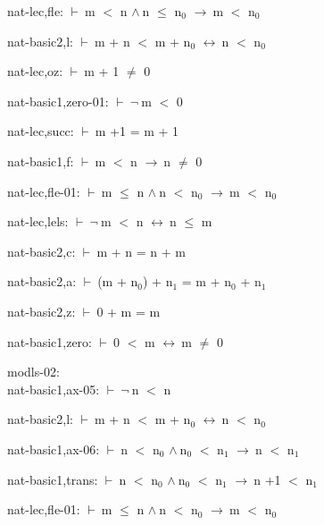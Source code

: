 \documentclass[a4paper]{article}
\newcommand{\Fol}{\mbox{$\vdash\ $}}
\newcommand{\Not}{\mbox{$\neg\ $}}
\newcommand{\And}{\mbox{$\wedge\ $}}
\newcommand{\Imp}{\mbox{$\rightarrow\ $}}
\newcommand{\Equiv}{\mbox{$\leftrightarrow\ $}}
\begin{document}
nat-lec,fle: 
 \Fol m $<$ n \And n $\le$ $\mbox{n}_{0}$ \Imp m $<$ $\mbox{n}_{0}$



nat-basic2,l: 
 \Fol m + n $<$ m + $\mbox{n}_{0}$ \Equiv n $<$ $\mbox{n}_{0}$



nat-lec,oz: 
 \Fol m + 1 $\neq$ 0



nat-basic1,zero-01: 
 \Fol \Not m $<$ 0



nat-lec,succ: 
 \Fol m +1 = m + 1



nat-basic1,f: 
 \Fol m $<$ n \Imp n $\neq$ 0



nat-lec,fle-01: 
 \Fol m $\le$ n \And n $<$ $\mbox{n}_{0}$ \Imp m $<$ $\mbox{n}_{0}$



nat-lec,lels: 
 \Fol \Not m $<$ n \Equiv n $\le$ m



nat-basic2,c: 
 \Fol m + n = n + m



nat-basic2,a: 
 \Fol (m + $\mbox{n}_{0}$) + $\mbox{n}_{1}$ = m + $\mbox{n}_{0}$ + $\mbox{n}_{1}$



nat-basic2,z: 
 \Fol 0 + m = m



nat-basic1,zero: 
 \Fol 0 $<$ m \Equiv m $\neq$ 0



\bigskip

modls-02:\\ nat-basic1,ax-05: 
 \Fol \Not n $<$ n



nat-basic2,l: 
 \Fol m + n $<$ m + $\mbox{n}_{0}$ \Equiv n $<$ $\mbox{n}_{0}$



nat-basic1,ax-06: 
 \Fol n $<$ $\mbox{n}_{0}$ \And $\mbox{n}_{0}$ $<$ $\mbox{n}_{1}$ \Imp n $<$ $\mbox{n}_{1}$



nat-basic1,trans: 
 \Fol n $<$ $\mbox{n}_{0}$ \And $\mbox{n}_{0}$ $<$ $\mbox{n}_{1}$ \Imp n +1 $<$ $\mbox{n}_{1}$



nat-lec,fle-01: 
 \Fol m $\le$ n \And n $<$ $\mbox{n}_{0}$ \Imp m $<$ $\mbox{n}_{0}$
\end{document}
